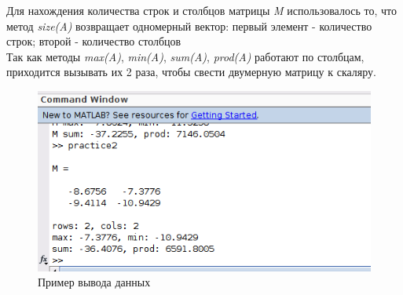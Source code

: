 \documentclass[12pt]{article}
\begin{document}
Для нахождения количества строк и столбцов матрицы \textit{M} использовалось то, что метод \textit{size(A)} возвращает одномерный вектор: первый элемент - количество строк; второй - количество столбцов\\

Так как методы \textit{max(A)}, \textit{min(A)}, \textit{sum(A)}, \textit{prod(A)} работают по столбцам, приходится вызывать их 2 раза, чтобы свести двумерную матрицу к скаляру.

\begin{figure}[!h]
	\centering
	\includegraphics[width=0.75\linewidth]{output.png}
	\caption{Пример вывода данных}
\end{figure}
\end{document}
